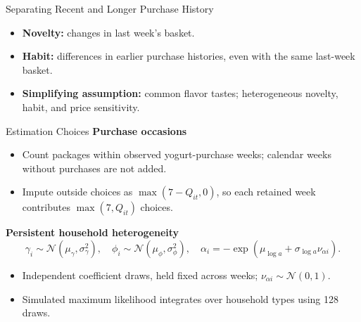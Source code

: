 \documentclass[aspectratio=169,professionalfonts]{beamer}
\newcommand{\shortbuttons}{}
\begin{document}
\gdef\shortbuttons{}
\begin{frame}[label=short-identification]{Separating Recent and Longer Purchase History}
  \begin{itemize}
    \item \textbf{Novelty:} changes in last week's basket.
    \item \textbf{Habit:} differences in earlier purchase histories, even with the same last-week basket.
    \item \textbf{Simplifying assumption:} common flavor tastes; heterogeneous novelty, habit, and price sensitivity.
  \end{itemize}
\end{frame}


\gdef\shortbuttons{\hyperlink{short-likelihood}{\beamergotobutton{Likelihood}}\hspace{.35em}\hyperlink{short-demand-fit}{\beamergotobutton{Fit summary}}\hspace{.35em}\hyperlink{short-28}{\beamergotobutton{Probabilities}}\hspace{.35em}\hyperlink{short-price-distribution}{\beamergotobutton{Price sensitivity}}}
\begin{frame}[label=short-29]{Estimation Choices}
  \small
  \textbf{Purchase occasions}
  \begin{itemize}
    \item Count packages within observed yogurt-purchase weeks; calendar weeks without purchases are not added.
    \item Impute outside choices as $\max(7-Q_{it},0)$, so each retained week contributes $\max(7,Q_{it})$ choices.
  \end{itemize}
  \medskip
  \textbf{Persistent household heterogeneity}
  \[
    \gamma_i\sim\mathcal N(\mu_\gamma,\sigma_\gamma^2),\quad
    \phi_i\sim\mathcal N(\mu_\phi,\sigma_\phi^2),\quad
    \alpha_i=-\exp(\mu_{\log a}+\sigma_{\log a}\nu_{\alpha i}).
  \]
  \begin{itemize}
    \item Independent coefficient draws, held fixed across weeks; $\nu_{\alpha i}\sim\mathcal N(0,1)$.
    \item Simulated maximum likelihood integrates over household types using 128 draws.
  \end{itemize}
\end{frame}
\end{document}

